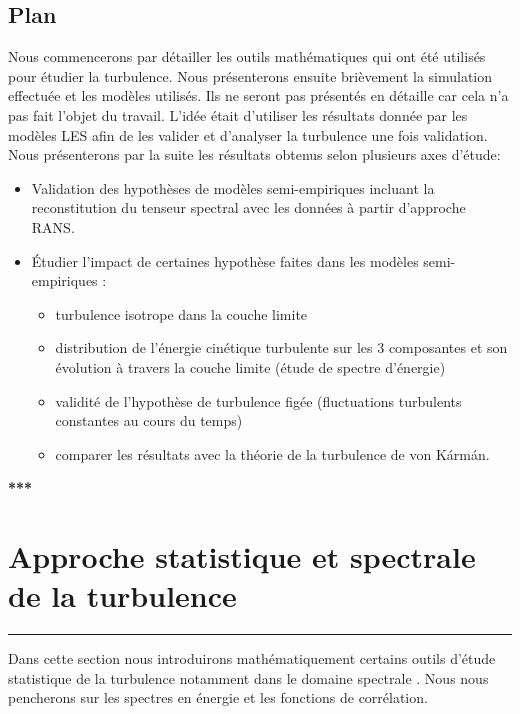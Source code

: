 \documentclass[12pt]{article}
\theoremstyle{plain}
\theoremstyle{remark}
\begin{document}
	\subsection{Plan}
	Nous commencerons par détailler les outils mathématiques qui ont été utilisés pour étudier la turbulence. Nous présenterons ensuite brièvement la simulation effectuée et les modèles utilisés. Ils ne seront pas présentés en détaille car cela n'a pas fait l'objet du travail. L'idée était d'utiliser les résultats donnée par les modèles LES afin de les valider et d'analyser la turbulence une fois validation. Nous présenterons par la suite les résultats obtenus selon plusieurs axes d'étude: 
	\begin{itemize}
		\item Validation des hypothèses de modèles semi-empiriques incluant la reconstitution du tenseur spectral avec les données à partir d'approche RANS.
		\item Étudier l'impact de certaines hypothèse faites dans les modèles semi-empiriques : 
		\begin{itemize}
			\item turbulence isotrope dans la couche limite
			\item distribution de l'énergie cinétique turbulente sur les 3 composantes et son évolution à travers la couche limite (étude de spectre d'énergie)
			\item validité de l'hypothèse de turbulence figée (fluctuations turbulents constantes au cours du temps)
			\item comparer les résultats avec la théorie de la turbulence de von Kármán.
		\end{itemize}
	\end{itemize}

\begin{center}
	\large {\bf{***}}
\end{center}

\vspace{0.3cm}
\section{Approche statistique et spectrale de la turbulence}
\noindent\rule{\linewidth}{2pt}
\vspace{0.1cm}

	Dans cette section nous introduirons mathématiquement certains outils d'étude statistique de la turbulence notamment dans le domaine spectrale \cite{mathieu2000introduction}. Nous nous pencherons sur les spectres en énergie et les fonctions de corrélation.
	
\end{document}
